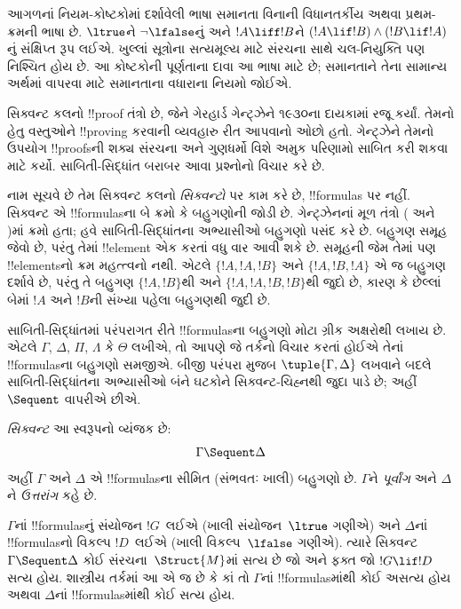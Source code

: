 \documentclass[../../../include/open-logic-section]{subfiles}
\begin{document}


આગળનાં નિયમ-કોષ્ટકોમાં દર્શાવેલી ભાષા
સમાનતા વિનાની વિધાનતર્કીય અથવા પ્રથમ-ક્રમની ભાષા છે.
$\ltrue$ને $\lnot\lfalse$નું અને
$!A \liff !B$ને $(!A \lif !B)\land(!B \lif !A)$નું
સંક્ષિપ્ત રૂપ લઈએ. ખુલ્લાં સૂત્રોના સત્યમૂલ્ય માટે
સંરચના સાથે ચલ-નિયુક્તિ પણ નિશ્ચિત હોય છે.
આ કોષ્ટકોની પૂર્ણતાના દાવા આ ભાષા માટે છે;
સમાનતાને તેના સામાન્ય અર્થમાં વાપરવા માટે
સમાનતાના વધારાના નિયમો જોઈએ.

સિક્વન્ટ કલનો !!{proof} તંત્રો છે,
જેને ગેરહાર્ડ ગેન્ટ્ઝેને ૧૯૩૦ના દાયકામાં રજૂ કર્યાં.
તેમનો હેતુ વસ્તુઓને !!{proving} કરવાની વ્યવહારુ રીત આપવાનો ઓછો હતો.
ગેન્ટ્ઝેને તેમનો ઉપયોગ !!{proof}sની શક્ય સંરચના
અને ગુણધર્મો વિશે અમુક પરિણામો સાબિત કરી શકવા માટે કર્યો.
સાબિતી-સિદ્ધાંત બરાબર આવા પ્રશ્નોનો વિચાર કરે છે.

નામ સૂચવે છે તેમ સિક્વન્ટ કલનો \emph{સિક્વન્ટો} પર કામ કરે છે,
!!{formula}s પર નહીં.
સિક્વન્ટ એ !!{formula}sના બે ક્રમો કે બહુગણોની જોડી છે.
ગેન્ટ્ઝેનનાં મૂળ તંત્રો ( અને )માં ક્રમો હતા;
હવે સાબિતી-સિદ્ધાંતના અભ્યાસીઓ બહુગણો પસંદ કરે છે.
બહુગણ સમૂહ જેવો છે, પરંતુ તેમાં !!{element}
એક કરતાં વધુ વાર આવી શકે છે.
સમૂહની જેમ તેમાં પણ !!{element}sનો ક્રમ મહત્ત્વનો નથી.
એટલે $\{!A, !A, !B\}$ અને $\{!A, !B, !A\}$
એ જ બહુગણ દર્શાવે છે,
પરંતુ તે બહુગણ $\{!A, !B\}$થી અને $\{!A, !A, !B, !B\}$થી જુદો છે,
કારણ કે છેલ્લાં બેમાં $!A$ અને $!B$ની સંખ્યા પહેલા બહુગણથી જુદી છે.

સાબિતી-સિદ્ધાંતમાં પરંપરાગત રીતે !!{formula}sના બહુગણો
મોટા ગ્રીક અક્ષરોથી લખાય છે.
એટલે $\Gamma$, $\Delta$, $\Pi$, $\Lambda$ કે $\Theta$ લખીએ,
તો આપણે જે તર્કનો વિચાર કરતાં હોઈએ તેનાં !!{formula}sના બહુગણો સમજીએ.
બીજી પરંપરા મુજબ $\tuple{\Gamma, \Delta}$ લખવાને બદલે
સાબિતી-સિદ્ધાંતના અભ્યાસીઓ બંને ઘટકોને સિક્વન્ટ-ચિહ્નથી જુદા પાડે છે;
અહીં~$\Sequent$ વાપરીએ છીએ.

\begin{defn}[સિક્વન્ટ]
\emph{સિક્વન્ટ} આ સ્વરૂપનો વ્યંજક છે:
\[
\Gamma \Sequent \Delta
\]
અહીં $\Gamma$ અને $\Delta$ એ !!{formula}sના સીમિત
(સંભવતઃ ખાલી) બહુગણો છે.
$\Gamma$ને \emph{પૂર્વાંગ} અને $\Delta$ને \emph{ઉત્તરાંગ} કહે છે.
\end{defn}

$\Gamma$નાં !!{formula}sનું સંયોજન $!G$~લઈએ
(ખાલી સંયોજન~$\ltrue$ ગણીએ)
અને $\Delta$નાં !!{formula}sનો વિકલ્પ $!D$~લઈએ
(ખાલી વિકલ્પ~$\lfalse$ ગણીએ).
ત્યારે સિક્વન્ટ $\Gamma \Sequent \Delta$
કોઈ સંરચના~$\Struct{M}$માં સત્ય છે
જો અને ફક્ત જો $!G \lif !D$ સત્ય હોય.
શાસ્ત્રીય તર્કમાં આ એ જ છે કે
કાં તો $\Gamma$નાં !!{formula}sમાંથી કોઈ અસત્ય હોય
અથવા $\Delta$નાં !!{formula}sમાંથી કોઈ સત્ય હોય.
\end{document}
